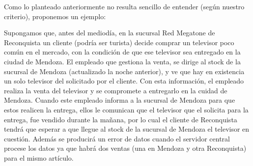 Como lo planteado anteriormente no resulta sencillo de entender (según nuestro
criterio), proponemos un ejemplo:

Supongamos que, antes del mediodía, en la sucursal Red Megatone de Reconquista
un cliente (podría ser turista) decide comprar un televisor poco común en el
mercado, con la condición de que ese televisor sea entregado en la ciudad de
Mendoza. El empleado que gestiona la venta, se dirige al stock de la sucursal
de Mendoza (actualizado la noche anterior), y ve que hay en existencia un solo
televisor del solicitado por el cliente. Con esta información, el empleado
realiza la venta del televisor y se compromete a entregarlo en la cuidad de
Mendoza. Cuando este empleado informa a la sucursal de Mendoza para que estos
realicen la entrega, ellos le comunican que el televisor que el solicita para
la entrega, fue vendido durante la mañana, por lo cual el cliente de
Reconquista tendrá que esperar a que llegue al stock de la sucursal de Mendoza
el televisor en cuestión. Además se producirá un error de datos cuando el
servidor central procese los datos ya que habrá dos ventas (una en Mendoza y
otra Reconquista) para el mismo artículo.

